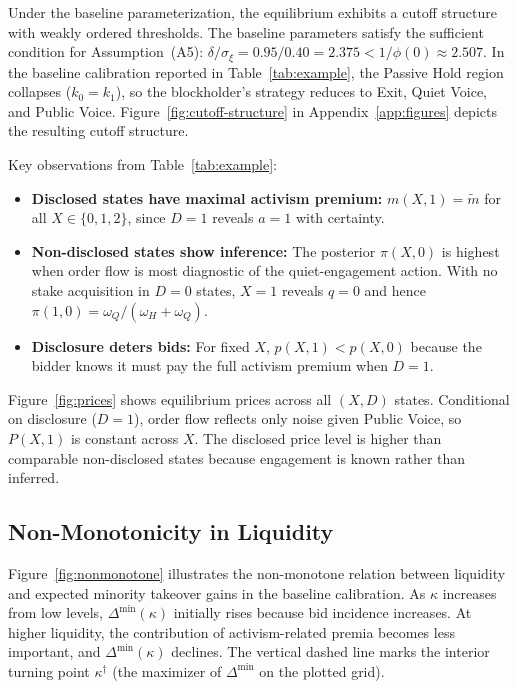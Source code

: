 \documentclass[11pt]{article}
\newcommand{\1}{\mathbf{1}}
\begin{document}
Under the baseline parameterization, the equilibrium exhibits a cutoff structure with weakly ordered thresholds. The baseline parameters satisfy the sufficient condition for Assumption~\textup{(A5)}: $\delta/\sigma_\xi = 0.95/0.40 = 2.375 < 1/\phi(0) \approx 2.507$. In the baseline calibration reported in Table~\ref{tab:example}, the Passive Hold region collapses ($k_0=k_1$), so the blockholder's strategy reduces to Exit, Quiet Voice, and Public Voice. Figure~\ref{fig:cutoff-structure} in Appendix~\ref{app:figures} depicts the resulting cutoff structure.

Key observations from Table~\ref{tab:example}:
\begin{itemize}[leftmargin=2em,itemsep=2pt]
\item \textbf{Disclosed states have maximal activism premium:} $m(X,1) = \tilde{m}$ for all $X \in \{0,1,2\}$, since $D=1$ reveals $a=1$ with certainty.
\item \textbf{Non-disclosed states show inference:} The posterior $\pi(X,0)$ is highest when order flow is most diagnostic of the quiet-engagement action. With no stake acquisition in $D=0$ states, $X=1$ reveals $q=0$ and hence $\pi(1,0)=\omega_Q/(\omega_H+\omega_Q)$.
\item \textbf{Disclosure deters bids:} For fixed $X$, $p(X,1) < p(X,0)$ because the bidder knows it must pay the full activism premium when $D=1$.
\end{itemize}

Figure~\ref{fig:prices} shows equilibrium prices across all $(X,D)$ states. Conditional on disclosure ($D=1$), order flow reflects only noise given Public Voice, so $P(X,1)$ is constant across $X$. The disclosed price level is higher than comparable non-disclosed states because engagement is known rather than inferred.

\subsection{Non-Monotonicity in Liquidity}

Figure~\ref{fig:nonmonotone} illustrates the non-monotone relation between liquidity and expected minority takeover gains in the baseline calibration. As $\kappa$ increases from low levels, $\Delta^{\min}(\kappa)$ initially rises because bid incidence increases. At higher liquidity, the contribution of activism-related premia becomes less important, and $\Delta^{\min}(\kappa)$ declines. The vertical dashed line marks the interior turning point $\kappa^{\dagger}$ (the maximizer of $\Delta^{\min}$ on the plotted grid).
\end{document}
